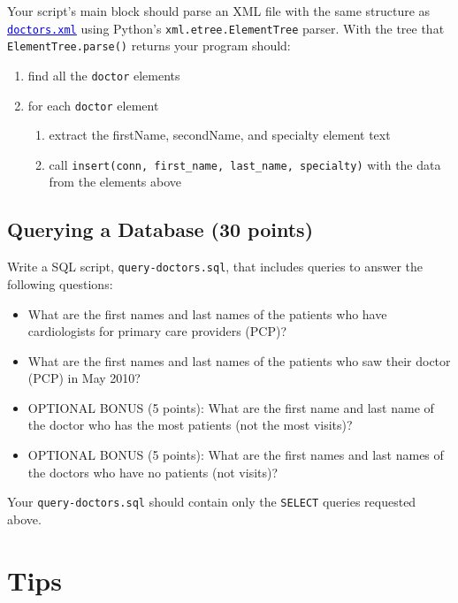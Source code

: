 \documentclass[12pt]{article}
\newcommand{\link}[2]{\href{#1}{\textcolor{blue}{\underline{#2}}}}
\begin{document}
Your script's main block should parse an XML file with the same structure as \link{http://www.cc.gatech.edu/~simpkins/teaching/gatech/cs2316/summer2016/hw3/doctors.xml}{{\tt doctors.xml}} using Python's {\tt xml.etree.ElementTree} parser.  With the tree that {\tt ElementTree.parse()} returns your program should:

\begin{enumerate}
\itemsep0em
\item find all the {\tt doctor} elements
\item for each {\tt doctor} element
\begin{enumerate}
\itemsep0em
  \item extract the firstName, secondName, and specialty element text
  \item call {\tt insert(conn, first\_name, last\_name, specialty)}
    with the data from the elements above
\end{enumerate}
\end{enumerate}

\subsection{Querying a Database (30 points)}\label{query}

Write a SQL script, {\tt query-doctors.sql}, that includes queries to answer the following questions:

\begin{itemize}
\itemsep0em
\item What are the first names and last names of the patients who have cardiologists for primary care providers (PCP)?
\item What are the first names and last names of the patients who saw their doctor (PCP) in May 2010?
\item OPTIONAL BONUS (5 points): What are the first name and last name of the doctor who has the most patients (not the most visits)?
\item OPTIONAL BONUS (5 points): What are the first names and last names of the doctors who have no patients (not visits)?
\end{itemize}

Your {\tt query-doctors.sql} should contain only the {\tt SELECT} queries requested above.

\section{Tips}
\end{document}

